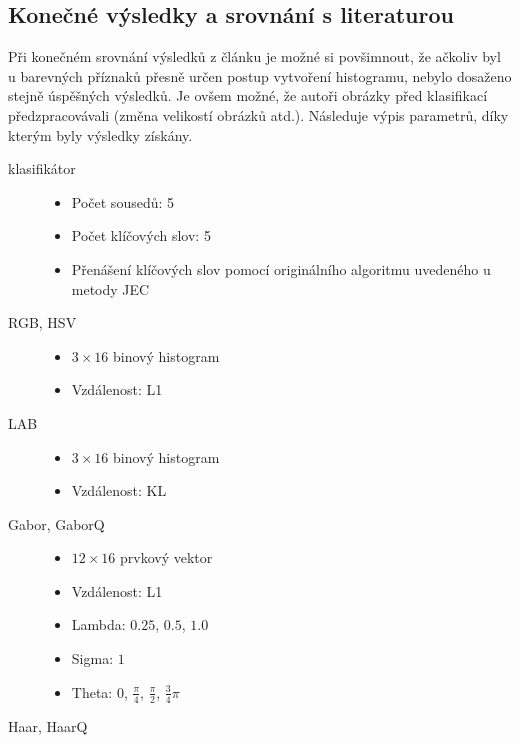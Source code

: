 \documentclass[czech,BP]{thesiskiv}
\begin{document}
\subsection{Konečné výsledky a srovnání s literaturou}
\par Při konečném srovnání výsledků z článku \cite{JEC2} je možné si povšimnout, že ačkoliv byl u barevných příznaků přesně určen postup vytvoření histogramu, nebylo dosaženo stejně úspěšných výsledků. Je ovšem možné, že autoři obrázky před klasifikací předzpracovávali (změna velikostí obrázků atd.). Následuje výpis parametrů, díky kterým byly výsledky získány.\\
\vspace{0.5cm}

\begin{description}
	\item[klasifikátor] \hfill 
		\begin{itemize}	
			\item Počet sousedů: 5
			\item Počet klíčových slov: 5
			\item Přenášení klíčových slov pomocí originálního algoritmu uvedeného u metody JEC
		\end{itemize}
	\item[RGB, HSV] \hfill 
		\begin{itemize} 
			\item $3\times 16$ binový histogram
			\item Vzdálenost: L1 	
		\end{itemize}
	\item[LAB] \hfill 
		\begin{itemize} 
			\item $3\times 16$ binový histogram
			\item Vzdálenost: KL 	
		\end{itemize}		
	\item[Gabor, GaborQ] \hfill 
		\begin{itemize} 
			\item $12 \times 16$ prvkový vektor
			\item Vzdálenost: L1 
			\item Lambda: $0.25$, $0.5$, $1.0$ 
			\item Sigma: $1$
			\item Theta: $0$, $\frac{\pi}{4}$, $\frac{\pi}{2}$, $\frac{3}{4}\pi$  	
		\end{itemize}
	\item[Haar, HaarQ] \hfill 
		\begin{itemize} 

\end{itemize}
\end{description}
\end{document}
